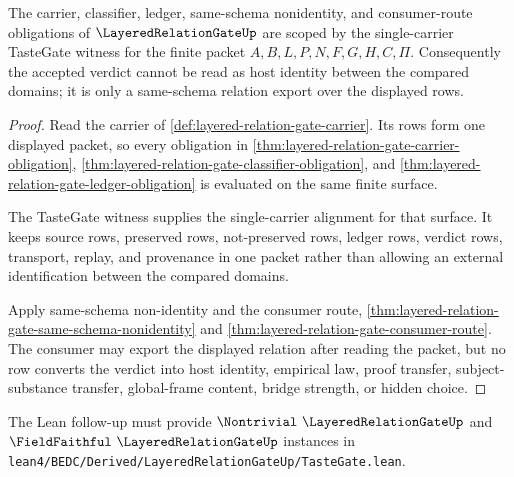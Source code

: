 \begin{theorem}
\label{thm:layered-relation-gate-obligation-scope}
The carrier, classifier, ledger, same-schema nonidentity, and consumer-route obligations of $\LayeredRelationGateUp$ are scoped by the single-carrier TasteGate witness for the finite packet $A,B,L,P,N,F,G,H,C,\Pi$. Consequently the accepted verdict cannot be read as host identity between the compared domains; it is only a same-schema relation export over the displayed rows.
\end{theorem}
\begin{proof}
Read the carrier of \autoref{def:layered-relation-gate-carrier}. Its rows form one displayed packet, so every obligation in \autoref{thm:layered-relation-gate-carrier-obligation}, \autoref{thm:layered-relation-gate-classifier-obligation}, and \autoref{thm:layered-relation-gate-ledger-obligation} is evaluated on the same finite surface.

The TasteGate witness supplies the single-carrier alignment for that surface. It keeps source rows, preserved rows, not-preserved rows, ledger rows, verdict rows, transport, replay, and provenance in one packet rather than allowing an external identification between the compared domains.

Apply same-schema non-identity and the consumer route, \autoref{thm:layered-relation-gate-same-schema-nonidentity} and \autoref{thm:layered-relation-gate-consumer-route}. The consumer may export the displayed relation after reading the packet, but no row converts the verdict into host identity, empirical law, proof transfer, subject-substance transfer, global-frame content, bridge strength, or hidden choice.
\end{proof}

The Lean follow-up must provide $\Nontrivial\ \LayeredRelationGateUp$ and $\FieldFaithful\ \LayeredRelationGateUp$ instances in \texttt{lean4/BEDC/Derived/LayeredRelationGateUp/TasteGate.lean}.


